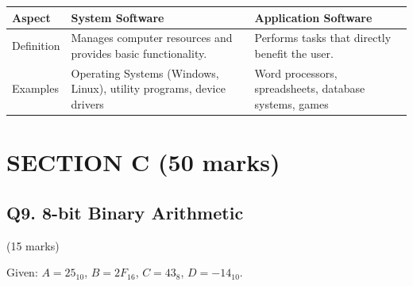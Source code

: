 \documentclass[12pt]{article}
\begin{document}
\begin{enumerate}[label=(\alph*)]
    \begin{center}
    \begin{tabular}{|p{4cm}|p{5.5cm}|p{5.5cm}|}
        \hline
        \textbf{Aspect} & \textbf{System Software} & \textbf{Application Software} \\
        \hline
        Definition & Manages computer resources and provides basic functionality. & Performs tasks that directly benefit the user. \\
        Examples & Operating Systems (Windows, Linux), utility programs, device drivers & Word processors, spreadsheets, database systems, games \\
        \hline
    \end{tabular}
    \end{center}
\end{enumerate}

\newpage

\section*{SECTION C (50 marks)}

\subsection*{Q9. 8-bit Binary Arithmetic} \hfill (15 marks)

Given: $A=25_{10}$, $B=2F_{16}$, $C=43_8$, $D=-14_{10}$.
\end{document}

